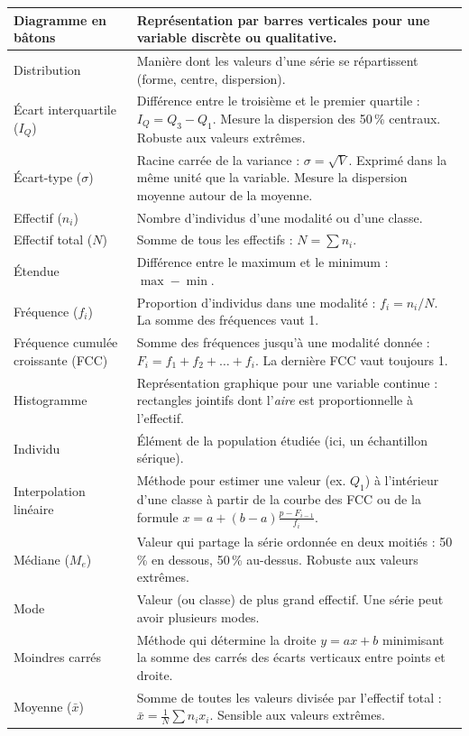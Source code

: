 \documentclass[11pt,a4paper]{article}
\begin{document}
{\begin{longtable}{|p{3cm}|p{12.5cm}|}
\hline
Diagramme en bâtons & Représentation par barres verticales pour une variable discrète ou qualitative. \\
\hline
Distribution & Manière dont les valeurs d'une série se répartissent (forme, centre, dispersion). \\
\hline
Écart interquartile ($I_Q$) & Différence entre le troisième et le premier quartile : $I_Q = Q_3 - Q_1$. Mesure la dispersion des 50\,\% centraux. Robuste aux valeurs extrêmes. \\
\hline
Écart-type ($\sigma$) & Racine carrée de la variance : $\sigma = \sqrt{V}$. Exprimé dans la même unité que la variable. Mesure la dispersion moyenne autour de la moyenne. \\
\hline
Effectif ($n_i$) & Nombre d'individus d'une modalité ou d'une classe. \\
\hline
Effectif total ($N$) & Somme de tous les effectifs : $N = \sum n_i$. \\
\hline
Étendue & Différence entre le maximum et le minimum : $\max - \min$. \\
\hline
Fréquence ($f_i$) & Proportion d'individus dans une modalité : $f_i = n_i / N$. La somme des fréquences vaut 1. \\
\hline
Fréquence cumulée croissante (FCC) & Somme des fréquences jusqu'à une modalité donnée : $F_i = f_1 + f_2 + \dots + f_i$. La dernière FCC vaut toujours 1. \\
\hline
Histogramme & Représentation graphique pour une variable continue : rectangles jointifs dont l'\emph{aire} est proportionnelle à l'effectif. \\
\hline
Individu & Élément de la population étudiée (ici, un échantillon sérique). \\
\hline
Interpolation linéaire & Méthode pour estimer une valeur (ex. $Q_1$) à l'intérieur d'une classe à partir de la courbe des FCC ou de la formule $x = a + (b-a)\frac{p - F_{i-1}}{f_i}$. \\
\hline
Médiane ($M_e$) & Valeur qui partage la série ordonnée en deux moitiés : 50\,\% en dessous, 50\,\% au-dessus. Robuste aux valeurs extrêmes. \\
\hline
Mode & Valeur (ou classe) de plus grand effectif. Une série peut avoir plusieurs modes. \\
\hline
Moindres carrés & Méthode qui détermine la droite $y = ax + b$ minimisant la somme des carrés des écarts verticaux entre points et droite. \\
\hline
Moyenne ($\bar{x}$) & Somme de toutes les valeurs divisée par l'effectif total : $\bar{x} = \frac{1}{N}\sum n_i x_i$. Sensible aux valeurs extrêmes. \\

\end{longtable}}
\end{document}

